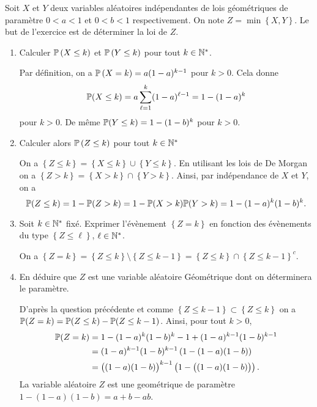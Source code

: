 \documentclass{tp_um}
\begin{document}
 Soit $X$ et $Y$ deux variables aléatoires indépendantes de lois géométriques de paramètre $0<a<1$ et $0<b<1$ respectivement. On note $Z = \min \left\{ X,Y \right\}$. Le but de l'exercice est de déterminer la loi de $Z$.
\begin{enumerate}
	\item Calculer $\P\left( X \leq k \right)$ et $\P\left( Y\leq k\right)$ pour tout $k\in \N^*$.

		\bigskip

		 Par définition, on a $\P\left( X=k \right) = a (1-a)^{k-1}$ pour $k>0$. Cela donne 
		 \[
		 \P(X\leq k) = a \sum_{\ell=1}^k (1-a)^{\ell-1} = 1 - (1-a)^{k}
	 \]
	 pour $k>0$. De même $\P(Y\leq k) = 1 - (1-b)^{k}$ pour $k>0$.
	
		\bigskip

	\item Calculer alors $\P\left( Z\leq k \right)$ pour tout $k \in \N^*$


		\bigskip

		On a $\left\{ Z \leq k \right\} = \left\{ X \leq k\right\} \cup \left\{ Y \leq k \right\}$. En utilisant les lois de De Morgan on a $\left\{ Z > k \right\} = \left\{ X > k\right\} \cap \left\{ Y > k \right\}$.  Ainsi, par indépendance de $X$ et $Y$, on a
		\[
\P(Z \leq k) = 1 - \P( Z>k) = 1 - \P(X>k)\P(Y>k)  = 1 - (1-a)^k (1-b)^k.
		\]


	\item Soit $k\in\N^*$ fixé. Exprimer l'évènement $\left\{ Z = k \right\}$ en fonction des évènements du type $\left\{ Z\leq \ell \right\}$, $\ell\in \N^*$.
		\bigskip

		On a $\left\{ Z = k \right\} =  \left\{ Z \leq k \right\} \setminus \left\{ Z \leq k-1 \right\} =  \left\{ Z \leq k \right\} \cap \left\{ Z \leq k-1 \right\}^c$.
		\bigskip
	\item En déduire que $Z$ est une variable aléatoire Géométrique dont on déterminera le paramètre.
		\bigskip

		D'après la question précédente et comme $\left\{ Z \leq k-1 \right\}\subset \left\{ Z \leq k\right\}  $ on a
		$\P(Z=k ) = \P(Z \leq k ) - \P(Z\leq k-1)$. Ainsi, pour tout $k>0$,
			\begin{align*}
				\P(Z= k ) &= 1 - (1-a)^k (1-b)^k - 1 + (1-a)^{k-1} (1-b)^{k-1} \\
				&= (1-a)^{k-1} (1-b)^{k-1} \left( 1 -(1-a) (1-b) \right) \\
				&= \big((1-a)(1-b)\big)^{k-1} \left( 1 -\big((1-a) (1-b)\big) \right). 
			\end{align*}
			La variable aléatoire $Z$ est une geométrique de paramètre $1 - (1-a)(1-b) = a + b - ab$.
		\bigskip

\end{enumerate}
\end{document}
